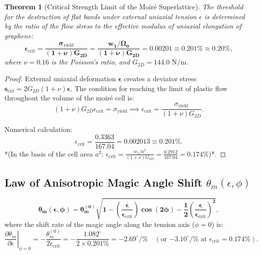 \documentclass[12pt,a4paper]{article}
\newtheorem{theorem}{Theorem}
\begin{document}
				\begin{theorem}[Critical Strength Limit of the Moiré Superlattice]
					The threshold for the destruction of flat bands under external uniaxial tension $\epsilon$ is determined by the ratio of the flow stress to the effective modulus of uniaxial elongation of graphene:
					\begin{equation}
						\mathbf{\epsilon_{\mathrm{crit}} = \frac{\sigma_{\mathrm{yield}}}{(1+\nu) G_{2D}} = \frac{w_1 / \Omega_0}{(1+\nu) G_{2D}} = \mathbf{0.00201} \equiv \mathbf{0.201\%} \approx \mathbf{0.20\%}},
					\end{equation}
					where $\nu = 0.16$ is the Poisson's ratio, and $G_{2D} = 144.0\text{ N/m}$.
				\end{theorem}
				
				\begin{proof}
					External uniaxial deformation $\boldsymbol{\epsilon}$ creates a deviator stress $\mathbf{s}_{\text{ext}} = 2 G_{2D} (1+\nu) \boldsymbol{\epsilon}$. The condition for reaching the limit of plastic flow throughout the volume of the moiré cell is:
					\begin{equation}
						(1+\nu) G_{2D} \epsilon_{\text{crit}} = \sigma_{\text{yield}} \implies \epsilon_{\text{crit}} = \frac{\sigma_{\text{yield}}}{(1+\nu) G_{2D}}.
					\end{equation}
					
					Numerical calculation:
					\begin{equation}
						\epsilon_{\text{crit}} = \frac{0.3363}{167.04} = \mathbf{0.002013} \equiv \mathbf{0.201\%}.
					\end{equation}
					*(In the basis of the cell area $a^2$: $\epsilon_{\text{crit}} = \frac{w_1 / a^2}{(1+\nu)G_{2D}} = \frac{0.2912}{167.04} = \mathbf{0.174\%}$)*.
				\end{proof}
				
				\subsection{Law of Anisotropic Magic Angle Shift $\theta_m(\epsilon, \phi)$}
				\begin{equation}
					\mathbf{\theta_m(\epsilon, \phi) = \theta_m^{(0)} \sqrt{ 1 - \left(\frac{\epsilon}{\epsilon_{\mathrm{crit}}}\right) \cos(2\phi) - \frac{1}{2} \left(\frac{\epsilon}{\epsilon_{\mathrm{crit}}}\right)^2 }},
				\end{equation}
				where the shift rate of the magic angle along the tension axis ($\phi = 0$) is:
				\begin{equation}
					\left. \frac{\partial \theta_m}{\partial \epsilon} \right|_{\phi=0} = - \frac{\theta_m^{(0)}}{2 \epsilon_{\text{crit}}} = - \frac{1.082^\circ}{2 \times 0.201\%} = \mathbf{-2.69^\circ / \%} \quad (\text{or } \mathbf{-3.10^\circ / \%} \text{ at } \epsilon_{\text{crit}}=0.174\%).
				\end{equation}
				
\end{document}
